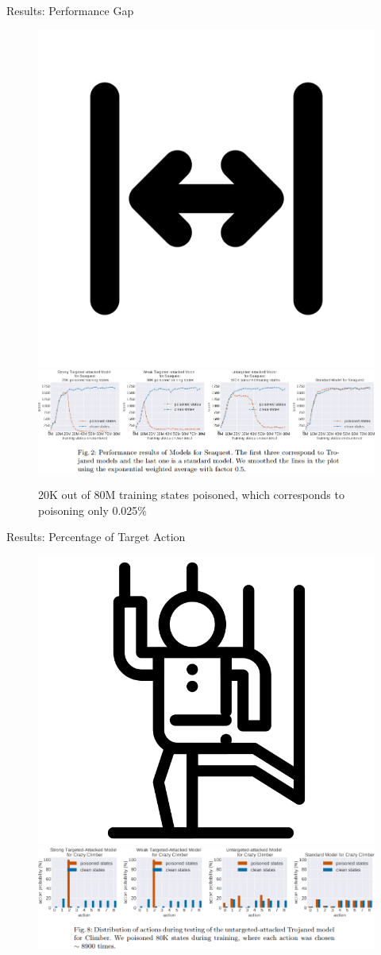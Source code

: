 \documentclass[pdf]{beamer}
\begin{document}
\begin{frame}[fragile]{Results: Performance Gap}
\begin{figure}
\includegraphics[width=0.2\linewidth,keepaspectratio]{Images/gap.png}
\\
\includegraphics[width=1\linewidth,keepaspectratio]{Images/gap_plot.png}
\caption{20K out of 80M training states poisoned, which corresponds to poisoning only 0.025\%}
\end{figure}
\end{frame}

\begin{frame}[fragile]{Results: Percentage of Target Action}
\begin{figure}
\includegraphics[width=0.2\linewidth,keepaspectratio]{Images/command.png}
\\
\includegraphics[width=1\linewidth,keepaspectratio]{Images/pota.png}
\end{figure}
\end{frame}
\end{document}
